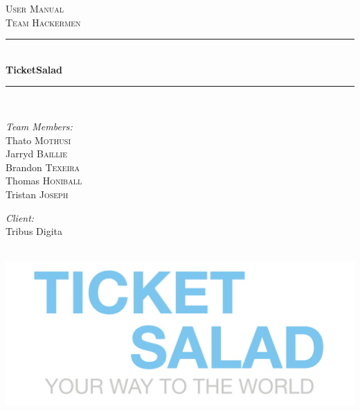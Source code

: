 \documentclass[11pt]{article}
\begin{document}
		\begin{titlepage}
			
			\newcommand{\HRule}{\rule{\linewidth}{0.5mm}} 
			
			\center 
			
			\textsc{\LARGE User Manual}\\[0.5cm] 
			\textsc{\Large Team Hackermen}\\[0.5cm] 
			
			\HRule \\[0.4cm]
			{ \huge \bfseries TicketSalad}\\[0.4cm] 
			\HRule \\[1.5cm]
			
			\begin{minipage}{0.4\textwidth}
				\begin{flushleft} \large
					\emph{Team Members:}\\
					Thato \textsc{Mothusi}\\
					Jarryd \textsc{Baillie}\\
					Brandon \textsc{Texeira}\\
					Thomas \textsc{Honiball}\\
					Tristan \textsc{Joseph}\\
				\end{flushleft}
			\end{minipage}
			
			\begin{minipage}{0.4\textwidth}
				\begin{flushright} \large
					\emph{Client:} \\
					Tribus Digita 
				\end{flushright}
			\end{minipage}\\[2cm]
			
			\includegraphics{logo.png}\\[1cm] 
			
		\end{titlepage}
	
\end{document}
